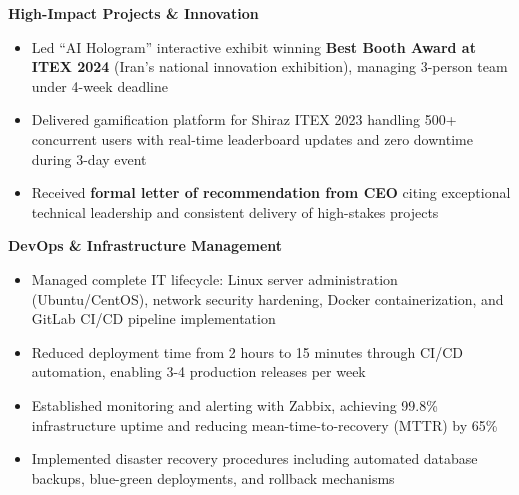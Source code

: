 \documentclass[11pt,a4paper,sans]{moderncv}
\begin{document}
{    \textbf{High-Impact Projects \& Innovation}
    \begin{itemize}
        \item Led ``AI Hologram'' interactive exhibit winning \textbf{Best Booth Award at ITEX 2024} (Iran's national innovation exhibition), managing 3-person team under 4-week deadline
        \item Delivered gamification platform for Shiraz ITEX 2023 handling 500+ concurrent users with real-time leaderboard updates and zero downtime during 3-day event
        \item Received \textbf{formal letter of recommendation from CEO} citing exceptional technical leadership and consistent delivery of high-stakes projects
    \end{itemize}
    
    \textbf{DevOps \& Infrastructure Management}
    \begin{itemize}
        \item Managed complete IT lifecycle: Linux server administration (Ubuntu/CentOS), network security hardening, Docker containerization, and GitLab CI/CD pipeline implementation
        \item Reduced deployment time from 2 hours to 15 minutes through CI/CD automation, enabling 3-4 production releases per week
        \item Established monitoring and alerting with Zabbix, achieving 99.8\% infrastructure uptime and reducing mean-time-to-recovery (MTTR) by 65\%
        \item Implemented disaster recovery procedures including automated database backups, blue-green deployments, and rollback mechanisms
    \end{itemize}
}
\end{document}
